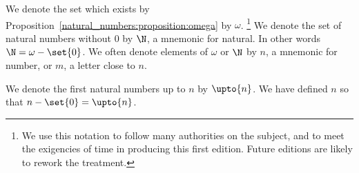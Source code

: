 We denote the set which exists by Proposition~\ref{natural_numbers:proposition:omega} by $\omega$.
\footnote{We use this notation to follow many authorities on the subject, and to meet the exigencies of time in producing this first edition. Future editions are likely to rework the treatment.}
We denote the set of natural numbers without 0 by $\N$, a mnemonic for natural.
In other words $\N = \omega - \set{0}$.
We often denote elements of $\omega$ or $\N$ by $n$, a mnemonic for number, or $m$, a letter close to $n$.

We denote the first natural numbers up to $n$ by $\upto{n}$.
We have defined $n$ so that $n - \set{0} = \upto{n}$.


%
%
%

%
%
%
%
%
%
%
%
%
